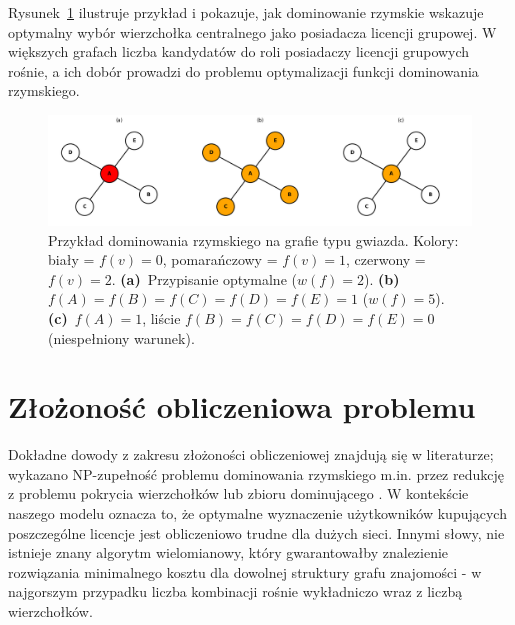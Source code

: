 Rysunek~\ref{fig:romandomatinonstarexamepl} ilustruje przykład i pokazuje, jak dominowanie rzymskie wskazuje optymalny wybór wierzchołka centralnego jako posiadacza licencji grupowej. W większych grafach liczba kandydatów do roli posiadaczy licencji grupowych rośnie, a ich dobór prowadzi do problemu optymalizacji funkcji dominowania rzymskiego.


\begin{figure}[H]
  \centering
  \includegraphics[width=1\textwidth]{assets/stars.png}
  \caption{
  Przykład dominowania rzymskiego na grafie typu gwiazda.  
  Kolory: biały = $f(v)=0$, pomarańczowy = $f(v)=1$, czerwony = $f(v)=2$.
    \textbf{(a)}~Przypisanie optymalne ($w(f)=2$).
    \textbf{(b)}~$f(A)=f(B)=f(C)=f(D)=f(E)=1$ ($w(f)=5$).
    \textbf{(c)}~$f(A)=1$, liście $f(B)=f(C)=f(D)=f(E)=0$ (niespełniony warunek).
  }
  \label{fig:romandomatinonstarexamepl}
\end{figure}


\section{Złożoność obliczeniowa problemu}

Dokładne dowody z zakresu złożoności obliczeniowej znajdują się w literaturze; wykazano NP-zupełność problemu dominowania rzymskiego m.in. przez redukcję z problemu pokrycia wierzchołków lub zbioru dominującego \cite{chambers2009}. W kontekście naszego modelu oznacza to, że optymalne wyznaczenie użytkowników kupujących poszczególne licencje jest obliczeniowo trudne dla dużych sieci. Innymi słowy, nie istnieje znany algorytm wielomianowy, który gwarantowałby znalezienie rozwiązania minimalnego kosztu dla dowolnej struktury grafu znajomości - w najgorszym przypadku liczba kombinacji rośnie wykładniczo wraz z liczbą wierzchołków.

